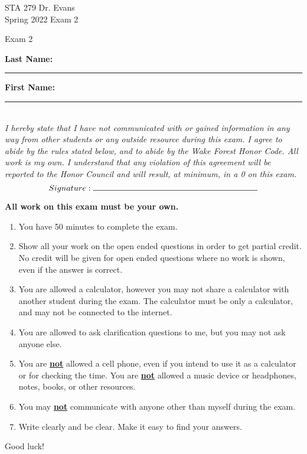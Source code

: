 \documentclass[11pt]{article}
\newcommand{\hl}[1]{\textbf{\underline{#1}}}
\begin{document}
\begin{titlepage}

\enlargethispage{\baselineskip}


STA 279 \hfill Dr. Evans \\
Spring 2022	\hfill Exam 2\\

\vspace{-2cm}

\begin{center}
{\Huge Exam 2}	
\end{center}

$\:$ \\

\textbf{Last Name:} \rule{5cm}{0.5pt}	\hfill	 \textbf{First Name:}  \rule{5cm}{0.5pt}	 \\
$\:$ \\
$\:$ \\

\textit{I hereby state that I have not communicated with or gained information in any way from other students or any outside resource during this exam. I agree to abide by the rules stated below, and to abide by the Wake Forest Honor Code. All work is my own. I understand that any violation of this agreement will be reported to the Honor Council and will result, at minimum, in a 0 on this exam.}
\[ Signature: \rule{7cm}{0.5pt}\]

\hdashrule[0.5ex]{\textwidth}{0.5pt}{3mm}

\textbf{All work on this exam must be your own.}

{\small
\begin{enumerate}
\item You have 50 minutes to complete the exam.
\item Show all your work on the open ended questions in order to get partial credit. No credit will be given for open ended questions where no work is shown, even if the answer is correct.
\item You are allowed a calculator, however you may not share a calculator with another student during the exam. The calculator must be only a calculator, and may not be connected to the internet. 
\item You are allowed to ask clarification questions to me, but you may not ask anyone else. 
\item You are \hl{not} allowed a cell phone, even if you intend to use it as a calculator or for checking the time. You are \hl{not} allowed a music device or headphones, notes, books, or other resources. 
\item You may \hl{not} communicate with anyone other than myself during the exam.
\item Write clearly and be clear. Make it easy to find your answers. 
\end{enumerate}
}
\begin{center}
{\Large Good luck!}
\end{center}
\hdashrule[0.5ex]{\textwidth}{0.5pt}{3mm}


\end{titlepage}
\end{document}
